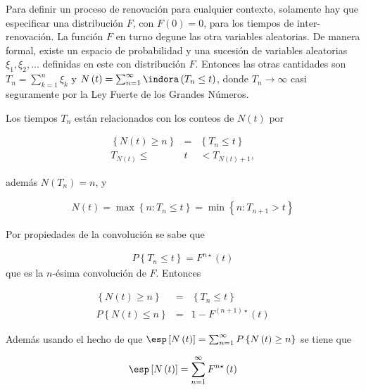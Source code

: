 \begin{Note}
Para definir un proceso de renovaci\'on para cualquier contexto, solamente hay que especificar una distribuci\'on $F$, con $F\left(0\right)=0$, para los tiempos de inter-renovaci\'on. La funci\'on $F$ en turno degune las otra variables aleatorias. De manera formal, existe un espacio de probabilidad y una sucesi\'on de variables aleatorias $\xi_{1},\xi_{2},\ldots$ definidas en este con distribuci\'on $F$. Entonces las otras cantidades son $T_{n}=\sum_{k=1}^{n}\xi_{k}$ y $N\left(t\right)=\sum_{n=1}^{\infty}\indora\left(T_{n}\leq t\right)$, donde $T_{n}\rightarrow\infty$ casi seguramente por la Ley Fuerte de los Grandes N\'umeros.
\end{Note}


Los tiempos $T_{n}$ est\'an relacionados con los conteos de $N\left(t\right)$ por

\begin{eqnarray*}
\left\{N\left(t\right)\geq n\right\}&=&\left\{T_{n}\leq t\right\}\\
T_{N\left(t\right)}\leq &t&<T_{N\left(t\right)+1},
\end{eqnarray*}

adem\'as $N\left(T_{n}\right)=n$, y 

\begin{eqnarray*}
N\left(t\right)=\max\left\{n:T_{n}\leq t\right\}=\min\left\{n:T_{n+1}>t\right\}
\end{eqnarray*}

Por propiedades de la convoluci\'on se sabe que

\begin{eqnarray*}
P\left\{T_{n}\leq t\right\}=F^{n\star}\left(t\right)
\end{eqnarray*}
que es la $n$-\'esima convoluci\'on de $F$. Entonces 

\begin{eqnarray*}
\left\{N\left(t\right)\geq n\right\}&=&\left\{T_{n}\leq t\right\}\\
P\left\{N\left(t\right)\leq n\right\}&=&1-F^{\left(n+1\right)\star}\left(t\right)
\end{eqnarray*}

Adem\'as usando el hecho de que $\esp\left[N\left(t\right)\right]=\sum_{n=1}^{\infty}P\left\{N\left(t\right)\geq n\right\}$
se tiene que

\begin{eqnarray*}
\esp\left[N\left(t\right)\right]=\sum_{n=1}^{\infty}F^{n\star}\left(t\right)
\end{eqnarray*}

